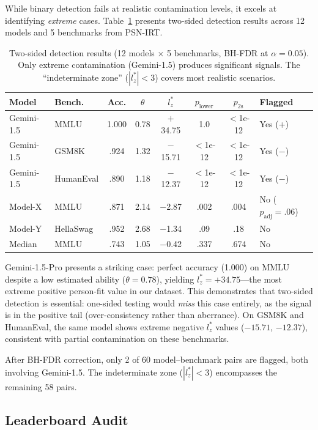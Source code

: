 \documentclass[11pt,a4paper]{article}
\begin{document}
While binary detection fails at realistic contamination levels, it excels at identifying \emph{extreme} cases. Table~\ref{tab:twosided} presents two-sided detection results across 12 models and 5 benchmarks from PSN-IRT.

\begin{table}[t]
\centering
\caption{Two-sided detection results (12 models $\times$ 5 benchmarks, BH-FDR at $\alpha = 0.05$). Only extreme contamination (Gemini-1.5) produces significant signals. The ``indeterminate zone'' ($|l_z^*| < 3$) covers most realistic scenarios.}
\label{tab:twosided}
\small
\begin{tabular}{@{}llcccccl@{}}
\toprule
Model & Bench. & Acc. & $\theta$ & $l_z^*$ & $p_\text{lower}$ & $p_\text{2s}$ & Flagged \\
\midrule
Gemini-1.5 & MMLU & 1.000 & 0.78 & $+$34.75 & 1.0 & $<$1e-12 & Yes (+) \\
Gemini-1.5 & GSM8K & .924 & 1.32 & $-$15.71 & $<$1e-12 & $<$1e-12 & Yes ($-$) \\
Gemini-1.5 & HumanEval & .890 & 1.18 & $-$12.37 & $<$1e-12 & $<$1e-12 & Yes ($-$) \\
Model-X & MMLU & .871 & 2.14 & $-$2.87 & .002 & .004 & No ($p_\text{adj}{=}.06$) \\
Model-Y & HellaSwag & .952 & 2.68 & $-$1.34 & .09 & .18 & No \\
Median & MMLU & .743 & 1.05 & $-$0.42 & .337 & .674 & No \\
\bottomrule
\end{tabular}
\end{table}

Gemini-1.5-Pro presents a striking case: perfect accuracy (1.000) on MMLU despite a low estimated ability ($\theta = 0.78$), yielding $l_z^* = +34.75$---the most extreme positive person-fit value in our dataset. This demonstrates that two-sided detection is essential: one-sided testing would \emph{miss} this case entirely, as the signal is in the positive tail (over-consistency rather than aberrance). On GSM8K and HumanEval, the same model shows extreme negative $l_z^*$ values ($-15.71$, $-12.37$), consistent with partial contamination on these benchmarks.

After BH-FDR correction, only 2 of 60 model--benchmark pairs are flagged, both involving Gemini-1.5. The indeterminate zone ($|l_z^*| < 3$) encompasses the remaining 58 pairs.

\subsection{Leaderboard Audit}
\label{sec:leaderboard}
\end{document}
